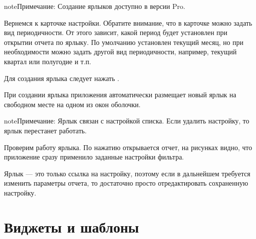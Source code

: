 \documentclass[a4paper,10pt,russian]{sphinxmanual}
\begin{document}
\begin{sphinxadmonition}{note}{Примечание:}
\sphinxAtStartPar
Создание ярлыков доступно в версии Pro.
\end{sphinxadmonition}

\sphinxAtStartPar
Вернемся к карточке настройки. Обратите внимание, что в карточке можно задать вид периодичности. От этого зависит,
какой период будет установлен при открытии отчета по ярлыку. По умолчанию установлен текущий месяц, но при
необходимости можно задать другой вид периодичности, например, текущий квартал или полугодие и т.п.

\sphinxAtStartPar
Для создания ярлыка следует нажать .

\noindent{}
\noindent{}

\sphinxAtStartPar
При создании ярлыка приложения автоматически размещает новый ярлык на свободном месте на одном из окон оболочки.

\begin{sphinxadmonition}{note}{Примечание:}
\sphinxAtStartPar
Ярлык связан с настройкой списка. Если удалить настройку, то ярлык перестанет работать.
\end{sphinxadmonition}

\noindent{}
\noindent{}
\noindent{}

\sphinxAtStartPar
Проверим работу ярлыка. По нажатию открывается отчет, на рисунках видно, что приложение сразу применило заданные
настройки фильтра.

\sphinxAtStartPar
Ярлык — это только ссылка на настройку, поэтому если в дальнейшем требуется изменить параметры отчета,
то достаточно просто отредактировать сохраненную настройку.

\sphinxstepscope


\chapter{Виджеты и шаблоны}
\label{\detokenize{widgets:chapter-widgets}}\label{\detokenize{widgets:id1}}\label{\detokenize{widgets::doc}}
\end{document}
